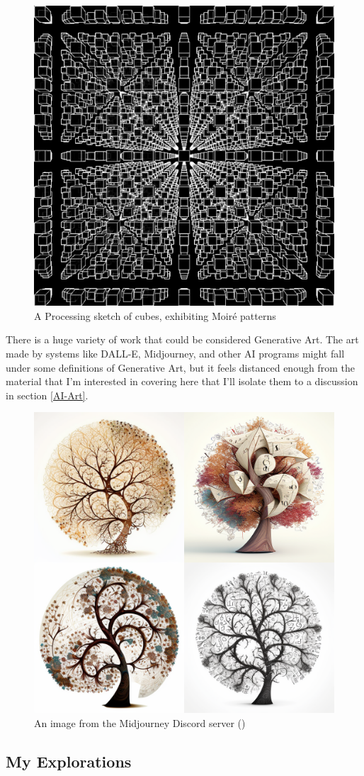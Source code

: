 \documentclass[12pt,twoside]{reedthesis}
\begin{document}
	\begin{figure}[h]
	\centering
	\includegraphics[width=0.7\linewidth]{Images/Grid}
	\caption{A Processing sketch of cubes, exhibiting Moiré patterns}
	\label{Grid}
	\end{figure}
	
	There is a huge variety of work that could be considered Generative Art. The art made by systems like DALL-E, Midjourney, and other AI programs might fall under some definitions of Generative Art, but it feels distanced enough from the material that I'm interested in covering here that I'll isolate them to a discussion in section \ref{AI-Art}.
	
	\begin{figure}[h]
	\centering
	\includegraphics[width=0.4\linewidth]{Images/MidjourneyMathTree}
	\caption{An image from the Midjourney Discord server (\cite{midjourney2023})}
	\label{Midjourney}
	\end{figure}
	
\subsection{My Explorations} %
	
\end{document}
